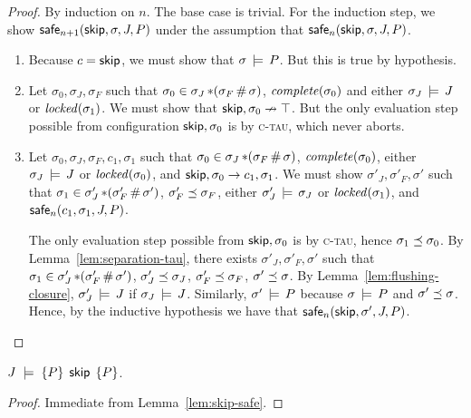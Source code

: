 \documentclass[11pt]{article}
\begin{document}
\begin{proof}
	By induction on $n$. The base case is trivial. For the induction step, we show $\mathsf{safe}_{n+1}(\operatorname{\mathsf{skip}},\sigma,J,P)$ under the assumption that $\mathsf{safe}_{n}(\operatorname{\mathsf{skip}},\sigma,J,P)$. 
	\begin{enumerate}
		\item Because $c = \operatorname{\mathsf{skip}}$, we must show that $\sigma \,\models\, P$. But this is true by hypothesis. 

		\item Let $\sigma_0,\sigma_J,\sigma_F$ such that $\sigma_0 \in \sigma_J \operatorname{\ast} (\sigma_F \operatorname{\#} \sigma)$, $\mathit{complete}(\sigma_0)$ and either $\sigma_J \,\models\, J$ or $\mathit{locked}(\sigma_1)$. We must show that $\operatorname{\mathsf{skip}},\sigma_0 \nrightarrow \top$. But the only evaluation step possible from configuration $\operatorname{\mathsf{skip}},\sigma_0$ is by \textsc{c-tau}, which never aborts. 

		\item Let $\sigma_0,\sigma_J,\sigma_F,c_1,\sigma_1$ such that $\sigma_0 \in \sigma_J \operatorname{\ast} (\sigma_F \operatorname{\#} \sigma)$, $\mathit{complete}(\sigma_0)$, either $\sigma_J \,\models\, J$ or $\mathit{locked}(\sigma_0)$, and $\operatorname{\mathsf{skip}},\sigma_0 \rightarrow c_1,\sigma_1$. We must show $\sigma'_J,\sigma'_F,\sigma'$ such that $\sigma_1 \in \sigma'_J \operatorname{\ast} (\sigma'_F \operatorname{\#} \sigma')$, $\sigma'_F \preceq \sigma_F$, either $\sigma'_J \,\models\, \sigma_J$ or $\mathit{locked}(\sigma_1)$, and $\mathsf{safe}_{n}(c_1,\sigma_1,J,P)$.

		The only evaluation step possible from $\operatorname{\mathsf{skip}},\sigma_0$ is by \textsc{c-tau}, hence $\sigma_1 \preceq \sigma_0$. By Lemma~\ref{lem:separation-tau}, there exists $\sigma'_J,\sigma'_F,\sigma'$ such that $\sigma_1 \in \sigma'_J \operatorname{\ast} (\sigma'_F \operatorname{\#} \sigma')$, $\sigma'_J \preceq \sigma_J$, $\sigma'_F \preceq \sigma_F$, $\sigma' \preceq \sigma$. By Lemma~\ref{lem:flushing-closure}, $\sigma'_J \,\models\, J$ if $\sigma_J \,\models\, J$. Similarly, $\sigma' \,\models\, P$ because $\sigma \,\models\, P$ and $\sigma' \preceq \sigma$. Hence, by the inductive hypothesis we have that $\mathsf{safe}_{n}(\operatorname{\mathsf{skip}},\sigma',J,P)$. 
	\end{enumerate}
\end{proof}

\begin{lemma}
	\label{lem:skip-sound}
	$J\;\models\;\left\lbrace P \right\rbrace\;\operatorname{\mathsf{skip}}\;\left\lbrace P \right\rbrace$. 
\end{lemma}

\begin{proof}
	Immediate from Lemma~\ref{lem:skip-safe}. 
\end{proof}
\end{document}
